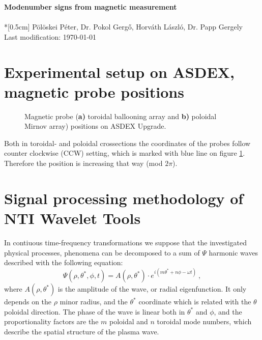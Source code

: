 \documentclass[12pt,a4paper]{article}
\begin{document}
\begin{center}
\vspace{3 cm}
\Large
{\bf Modenumber signs from magnetic measurement}\\ 
~\\*[0.5cm] \normalsize 
Pölöskei Péter, Dr. Pokol Gergő, Horváth László, Dr. Papp Gergely
\\

\vspace{2 cm}
Last modification: \today
\end{center}
\vspace{4 cm}

\pagestyle{empty}
\newpage

\section{Experimental setup on ASDEX, magnetic probe positions}
\begin{figure}[htb!]
  \centerline{}
  \caption{\label{fig:probe_pos}Magnetic probe (\textbf{a)} toroidal ballooning array and \textbf{b)} poloidal Mirnov array) positions on ASDEX Upgrade.}
\end{figure}

Both in toroidal- and poloidal crossections the coordinates of the probes follow counter clockwise (CCW) setting, which is marked with blue line on figure \ref{fig:probe_pos}. Therefore the position is increasing that way (mod $2\pi$).
\section{Signal processing methodology of NTI Wavelet Tools}
In contiuous time-frequency transformations we suppose that the investigated physical processes, phenomena can be decomposed to a sum of $\Psi$ harmonic waves described with the following equation:
\begin{equation} \label{eq:harmonic}
	\Psi(\rho,\theta^*,\phi,t) = A(\rho,\theta^*) \cdot e^{i(m\theta^*+n\phi-\omega t)} \ ,
\end{equation}
where $A(\rho,\theta^*)$ is the amplitude of the wave, or radial eigenfunction. It only depends on the $\rho$ minor radius, and the $\theta^*$ coordinate which is related with the $\theta$ poloidal direction. The phase of the wave is linear both in $\theta^*$ and $\phi$, and the proportionality factors are the $m$ poloidal and $n$ toroidal mode numbers, which describe the spatial structure of the plasma wave.
\end{document}
